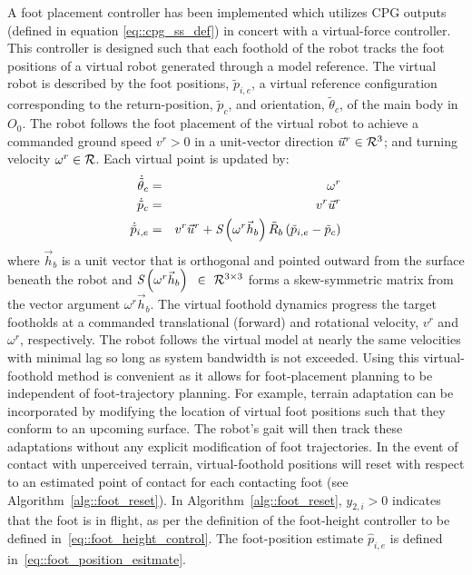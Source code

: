 		A foot placement controller has been implemented which utilizes CPG outputs (defined in equation \ref{eq::cpg_ss_def}) in concert with a virtual-force controller. This controller is designed such that each foothold of the robot tracks the foot positions of a virtual robot generated through a model reference. The virtual robot is described by the foot positions, $\tilde{p}_{i,e}$, a virtual reference configuration corresponding to the return-position, $\tilde{p}_{c}$, and orientation, $\tilde{\theta}_{c}$, of the main body in $O_{0}$. The robot follows the foot placement of the virtual robot to achieve a commanded ground speed $v^{r} > 0$ in a unit-vector direction $\vec{u}^{r} \in {\cal R}^{3}$; and turning velocity $\omega^{r} \in {\cal R}$. Each virtual point is updated by:
		\begin{eqnarray}
			\dot{\tilde{\theta}}_{c}	& = & \omega^{r} 				\nonumber\\
			\dot{\tilde{p}}_{c}			& = & v^{r}\vec{u}^{r}			\nonumber\\
			\dot{\tilde{p}}_{i,e} 		& = & v^{r}\vec{u}^{r} + \emph{S}\left(\omega^{r}\vec{h}_{b}\right) \tilde{R}_{b} \left(\tilde{p}_{i,e}-\tilde{p}_{c} \right) 
			\label{eq::virtual_foothold_control}
		\end{eqnarray}
		where $\vec{h}_{b}$ is a unit vector that is orthogonal and pointed outward from the surface beneath the robot and $\emph{S}\left(\omega^{r}\vec{h}_{b}\right)\text{ }\in\text{ }{\cal R}^{3\times3}$ forms a skew-symmetric matrix from the vector argument $\omega^{r}\vec{h}_{b}$. The virtual foothold dynamics progress the target footholds at a commanded translational (forward) and rotational velocity, $v^{r}$ and $\omega^{r}$, respectively. The robot follows the virtual model at nearly the same velocities with minimal lag so long as system bandwidth is not exceeded. Using this virtual-foothold method is convenient as it allows for foot-placement planning to be independent of foot-trajectory planning. For example, terrain adaptation can be incorporated by modifying the location of virtual foot positions such that they conform to an upcoming surface. The robot's gait will then track these adaptations without any explicit modification of foot trajectories. In the event of contact with unperceived terrain, virtual-foothold positions will reset with respect to an estimated point of contact for each \Ith contacting foot (see Algorithm~\ref{alg::foot_reset}). In Algorithm~\ref{alg::foot_reset}, $y_{2,i}>0$ indicates that the \Ith foot is in flight, as per the definition of the foot-height controller to be defined in~\ref{eq::foot_height_control}. The foot-position estimate $\hat{p}_{i,e}$ is defined in~\ref{eq::foot_position_esitmate}.


